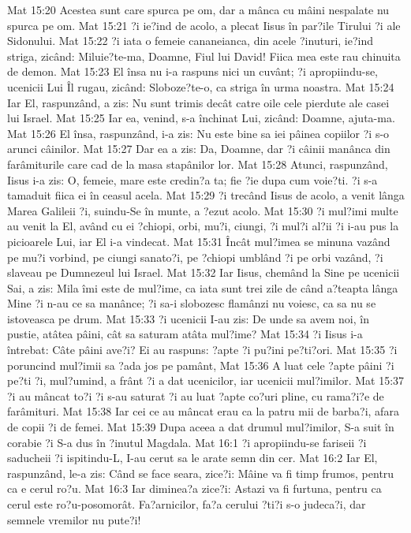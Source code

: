 Mat 15:20  Acestea sunt care spurca pe om, dar a mânca cu mâini nespalate nu spurca pe om.
Mat 15:21  ?i ie?ind de acolo, a plecat Iisus în par?ile Tirului ?i ale Sidonului.
Mat 15:22  ?i iata o femeie cananeianca, din acele ?inuturi, ie?ind striga, zicând: Miluie?te-ma, Doamne, Fiul lui David! Fiica mea este rau chinuita de demon.
Mat 15:23  El însa nu i-a raspuns nici un cuvânt; ?i apropiindu-se, ucenicii Lui Îl rugau, zicând: Sloboze?te-o, ca striga în urma noastra.
Mat 15:24  Iar El, raspunzând, a zis: Nu sunt trimis decât catre oile cele pierdute ale casei lui Israel.
Mat 15:25  Iar ea, venind, s-a închinat Lui, zicând: Doamne, ajuta-ma.
Mat 15:26  El însa, raspunzând, i-a zis: Nu este bine sa iei pâinea copiilor ?i s-o arunci câinilor.
Mat 15:27  Dar ea a zis: Da, Doamne, dar ?i câinii manânca din farâmiturile care cad de la masa stapânilor lor.
Mat 15:28  Atunci, raspunzând, Iisus i-a zis: O, femeie, mare este credin?a ta; fie ?ie dupa cum voie?ti. ?i s-a tamaduit fiica ei în ceasul acela.
Mat 15:29  ?i trecând Iisus de acolo, a venit lânga Marea Galileii ?i, suindu-Se în munte, a ?ezut acolo.
Mat 15:30  ?i mul?imi multe au venit la El, având cu ei ?chiopi, orbi, mu?i, ciungi, ?i mul?i al?ii ?i i-au pus la picioarele Lui, iar El i-a vindecat.
Mat 15:31  Încât mul?imea se minuna vazând pe mu?i vorbind, pe ciungi sanato?i, pe ?chiopi umblând ?i pe orbi vazând, ?i slaveau pe Dumnezeul lui Israel.
Mat 15:32  Iar Iisus, chemând la Sine pe ucenicii Sai, a zis: Mila îmi este de mul?ime, ca iata sunt trei zile de când a?teapta lânga Mine ?i n-au ce sa manânce; ?i sa-i slobozesc flamânzi nu voiesc, ca sa nu se istoveasca pe drum.
Mat 15:33  ?i ucenicii I-au zis: De unde sa avem noi, în pustie, atâtea pâini, cât sa saturam atâta mul?ime?
Mat 15:34  ?i Iisus i-a întrebat: Câte pâini ave?i? Ei au raspuns: ?apte ?i pu?ini pe?ti?ori.
Mat 15:35  ?i poruncind mul?imii sa ?ada jos pe pamânt,
Mat 15:36  A luat cele ?apte pâini ?i pe?ti ?i, mul?umind, a frânt ?i a dat ucenicilor, iar ucenicii mul?imilor.
Mat 15:37  ?i au mâncat to?i ?i s-au saturat ?i au luat ?apte co?uri pline, cu rama?i?e de farâmituri.
Mat 15:38  Iar cei ce au mâncat erau ca la patru mii de barba?i, afara de copii ?i de femei.
Mat 15:39  Dupa aceea a dat drumul mul?imilor, S-a suit în corabie ?i S-a dus în ?inutul Magdala.
Mat 16:1  ?i apropiindu-se fariseii ?i saducheii ?i ispitindu-L, I-au cerut sa le arate semn din cer.
Mat 16:2  Iar El, raspunzând, le-a zis: Când se face seara, zice?i: Mâine va fi timp frumos, pentru ca e cerul ro?u.
Mat 16:3  Iar diminea?a zice?i: Astazi va fi furtuna, pentru ca cerul este ro?u-posomorât. Fa?arnicilor, fa?a cerului ?ti?i s-o judeca?i, dar semnele vremilor nu pute?i!
